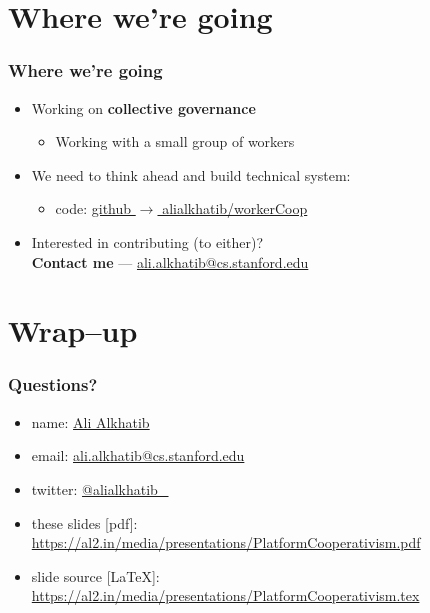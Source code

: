\documentclass{beamer}
\begin{document}
\section[Moving forward]{Where we're going}
\begin{frame}
  \frametitle{Where we're going}
  \begin{itemize}
    \item Working on \textbf{collective governance}
    \begin{itemize}
      \item Working with a small group of workers
    \end{itemize}
    \item We need to think ahead and build technical system:
    \begin{itemize}
      \item code:
      \href{https://github.com/alialkhatib/workerCoop}{github $\rightarrow$ alialkhatib/workerCoop}
    \end{itemize}
    \item Interested in contributing (to either)?\\
    \textbf{Contact me} --- \href{mailto:ali.alkhatib@cs.stanford.edu}{ali.alkhatib@cs.stanford.edu}
  \end{itemize}
\end{frame}

\section[Questions, etc\ldots]{Wrap--up}
\begin{frame}
  \frametitle{Questions?}
  \begin{itemize}
    \item name: \href{https://ali-alkhatib.com}{Ali Alkhatib}
    \item email: \href{mailto:ali.alkhatib@cs.stanford.edu}{ali.alkhatib@cs.stanford.edu}
    \item twitter: \href{https://twitter.com/alialkhatib_}{@alialkhatib\_}
    \item these slides [pdf]:
    {\footnotesize \url{https://al2.in/media/presentations/PlatformCooperativism.pdf}}
    \item slide source [\LaTeX]:
    {\footnotesize \url{https://al2.in/media/presentations/PlatformCooperativism.tex}}
  \end{itemize}
\end{frame}
\end{document}
